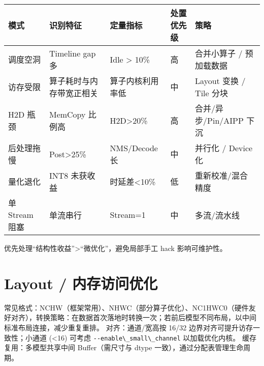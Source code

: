 \begin{longtable}[]{@{}
  >{\raggedright\arraybackslash}p{}
  >{\raggedright\arraybackslash}p{}
  >{\raggedright\arraybackslash}p{}
  >{\raggedright\arraybackslash}p{}
  >{\raggedright\arraybackslash}p{}@{}}
\toprule\noalign{}
\begin{minipage}[b]{\linewidth}\raggedright
模式
\end{minipage} & \begin{minipage}[b]{\linewidth}\raggedright
识别特征
\end{minipage} & \begin{minipage}[b]{\linewidth}\raggedright
定量指标
\end{minipage} & \begin{minipage}[b]{\linewidth}\raggedright
处置优先级
\end{minipage} & \begin{minipage}[b]{\linewidth}\raggedright
策略
\end{minipage} \\
\midrule\noalign{}
\endhead
\bottomrule\noalign{}
\endlastfoot
调度空洞 & Timeline gap 多 & Idle \textgreater{} 10\% & 高 & 合并小算子
/ 预加载数据 \\
访存受限 & 算子耗时与内存带宽正相关 & 算子内核利用率低 & 中 & Layout
变换 / Tile 分块 \\
H2D 瓶颈 & MemCopy 比例高 & H2D\textgreater20\% & 高 &
合并/异步/Pin/AIPP 下沉 \\
后处理拖慢 & Post\textgreater25\% & NMS/Decode 长 & 中 & 并行化 / Device
化 \\
量化退化 & INT8 未获收益 & 时延差\textless10\% & 低 &
重新校准/混合精度 \\
单 Stream 阻塞 & 单流串行 & Stream=1 & 中 & 多流/流水线 \\
\end{longtable}

优先处理``结构性收益''\textgreater``微优化''，避免局部手工 hack
影响可维护性。

\section{Layout /
内存访问优化}\label{layout-ux5185ux5b58ux8bbfux95eeux4f18ux5316}

常见格式：NCHW（框架常用）、NHWC（部分算子优化）、NC1HWC0（硬件友好对齐），转换策略：在数据首次落地时转换一次；若前后模型不同布局，以中间标准布局连接，减少重复重排。
对齐：通道/宽高按 16/32 边界对齐可提升访存一致性；小通道 (\textless16)
可考虑 \passthrough{\lstinline!--enable\_small\_channel!}
以加载优化内核。 缓存复用：多模型共享中间 Buffer（需尺寸与 dtype
一致），通过分配表管理生命周期。

